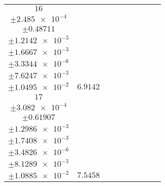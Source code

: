 \documentclass[8pt]{article}
\begin{document}
\begin{longtable}[l]{c c c c c c c c c}
$\num{16}$ & \begin{tabular}[c]{@{}c@{}}$\num{2.9284e-2}$ \\ $\pm\num{2.485e-4}$\end{tabular} & \begin{tabular}[c]{@{}c@{}}$\num{-0.33212}$ \\ $\pm\num{0.48711}$\end{tabular} & \begin{tabular}[c]{@{}c@{}}$\num{-7.0285}$ \\ $\pm\num{1.2142e-3}$\end{tabular} & \begin{tabular}[c]{@{}c@{}}$\num{3.6197e+3}$ \\ $\pm\num{1.6667e-3}$\end{tabular} & \begin{tabular}[c]{@{}c@{}}$\num{7.2413}$ \\ $\pm\num{3.3344e-6}$\end{tabular} & \begin{tabular}[c]{@{}c@{}}$\num{0.69267}$ \\ $\pm\num{7.6247e-3}$\end{tabular} & \begin{tabular}[c]{@{}c@{}}$\num{0.74061}$ \\ $\pm\num{1.0495e-2}$\end{tabular} & $\num{6.9142}$\\
$\num{17}$ & \begin{tabular}[c]{@{}c@{}}$\num{2.8696e-2}$ \\ $\pm\num{3.082e-4}$\end{tabular} & \begin{tabular}[c]{@{}c@{}}$\num{0.46418}$ \\ $\pm\num{0.61907}$\end{tabular} & \begin{tabular}[c]{@{}c@{}}$\num{-0.85606}$ \\ $\pm\num{1.2986e-3}$\end{tabular} & \begin{tabular}[c]{@{}c@{}}$\num{3.6258e+3}$ \\ $\pm\num{1.7408e-3}$\end{tabular} & \begin{tabular}[c]{@{}c@{}}$\num{7.2537}$ \\ $\pm\num{3.4826e-6}$\end{tabular} & \begin{tabular}[c]{@{}c@{}}$\num{0.68127}$ \\ $\pm\num{8.1289e-3}$\end{tabular} & \begin{tabular}[c]{@{}c@{}}$\num{0.62531}$ \\ $\pm\num{1.0885e-2}$\end{tabular} & $\num{7.5458}$\\

\end{longtable}
\end{document}
